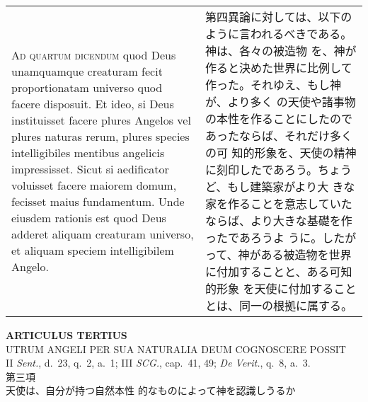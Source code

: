 \documentclass[10pt]{jsarticle} %
\begin{document}
\begin{longtable}{p{21em}p{21em}}
{\scshape Ad quartum dicendum} quod Deus unamquamque creaturam fecit
proportionatam universo quod facere disposuit. Et ideo, si Deus
instituisset facere plures Angelos vel plures naturas rerum, plures
species intelligibiles mentibus angelicis impressisset. Sicut si
aedificator voluisset facere maiorem domum, fecisset maius
fundamentum. Unde eiusdem rationis est quod Deus adderet aliquam
creaturam universo, et aliquam speciem intelligibilem Angelo.

&

第四異論に対しては、以下のように言われるべきである。神は、各々の被造物
を、神が作ると決めた世界に比例して作った。それゆえ、もし神が、より多く
の天使や諸事物の本性を作ることにしたのであったならば、それだけ多くの可
知的形象を、天使の精神に刻印したであろう。ちょうど、もし建築家がより大
きな家を作ることを意志していたならば、より大きな基礎を作ったであろうよ
うに。したがって、神がある被造物を世界に付加することと、ある可知的形象
を天使に付加することとは、同一の根拠に属する。



\end{longtable}
\newpage


\begin{center}
{\Large {\bf ARTICULUS TERTIUS}}\\ {\large UTRUM ANGELI PER SUA
NATURALIA DEUM COGNOSCERE POSSIT}\\ {\footnotesize II {\itshape
Sent.}, d.~23, q.~2, a.~1; III {\itshape SCG.}, cap.~41, 49; {\itshape
De Verit.}, q.~8, a.~3.}\\ {\Large 第三項\\天使は、自分が持つ自然本性
的なものによって神を認識しうるか}
\end{center}
\end{document}
